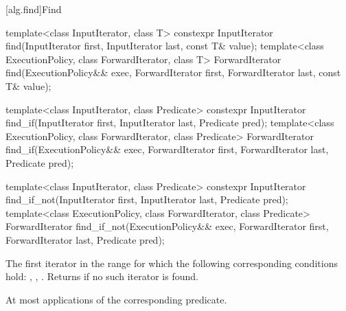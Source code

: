 [alg.find]{Find}

%
%
%
\begin{itemdecl}
template<class InputIterator, class T>
  constexpr InputIterator find(InputIterator first, InputIterator last,
                               const T& value);
template<class ExecutionPolicy, class ForwardIterator, class T>
  ForwardIterator find(ExecutionPolicy&& exec, ForwardIterator first, ForwardIterator last,
                       const T& value);

template<class InputIterator, class Predicate>
  constexpr InputIterator find_if(InputIterator first, InputIterator last,
                                  Predicate pred);
template<class ExecutionPolicy, class ForwardIterator, class Predicate>
  ForwardIterator find_if(ExecutionPolicy&& exec, ForwardIterator first, ForwardIterator last,
                          Predicate pred);

template<class InputIterator, class Predicate>
  constexpr InputIterator find_if_not(InputIterator first, InputIterator last,
                                      Predicate pred);
template<class ExecutionPolicy, class ForwardIterator, class Predicate>
  ForwardIterator find_if_not(ExecutionPolicy&& exec, ForwardIterator first, ForwardIterator last,
                              Predicate pred);
\end{itemdecl}

\begin{itemdescr}
\pnum
\returns
The first iterator
in the range
for which the following corresponding
conditions hold:
, , .
Returns  if no such iterator is found.

\pnum
\complexity
At most
applications of the corresponding predicate.
\end{itemdescr}

